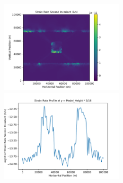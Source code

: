 \begin{figure}[h]
\centering
\includegraphics[width=6cm]{gerya_2019_vep/strain_rate_field.pdf}
\includegraphics[width=6cm]{gerya_2019_vep/strain_rate_profile.pdf}
\caption{}
\label{fig:gerya_2019_vep_results}
\end{figure}